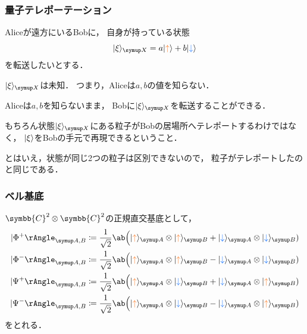 \documentclass[
    10pt,
    ]{sotsu-beamer}
\newcommand{\bitone}{\mathcolor{fire}{\uparrow}}
\newcommand{\bittwo}{\mathcolor{water}{\downarrow}}
\begin{document}
\begin{frame}
    \frametitle{量子テレポーテーション}

    Aliceが遠方にいるBobに，
    自身が持っている状態
    \begin{equation*}
        \ket{\xi}<X> = a \ket{\bitone} + b \ket{\bittwo}
    \end{equation*}
    を転送したいとする．

    \alert{$\ket{\xi}<X>$は未知．}
    つまり，Aliceは$a, b$の値を知らない．

    \pause

    Aliceは$a, b$を知らないまま，
    Bobに$\ket{\xi}<X>$を転送することができる．

    もちろん状態$\ket{\xi}<X>$にある粒子がBobの居場所へテレポートするわけではなく，
    $\ket{\xi}$をBobの手元で再現できるということ．

    {\small
        とはいえ，状態が同じ2つの粒子は区別できないので，
        粒子がテレポートしたのと同じである．
    }

\end{frame}


\begin{frame}
    \frametitle{ベル基底}

    $\symbb{C}^2 \otimes \symbb{C}^2$の正規直交基底として，
        \begin{align*}
            \Ket{\Phi^+}<A,B> 
                &\coloneq \frac{1}{\sqrt{2}}
                    \ab\Big( \ket{\bitone}<A> \otimes \ket{\bitone}<B> + \ket{\bittwo}<A> \otimes \ket{\bittwo}<B> )
            \\
            \Ket{\Phi^-}<A,B> 
                &\coloneq \frac{1}{\sqrt{2}}
                    \ab\Big( \ket{\bitone}<A> \otimes \ket{\bitone}<B> - \ket{\bittwo}<A> \otimes \ket{\bittwo}<B> )
            \\
            \Ket{\Psi^+}<A,B> 
                &\coloneq \frac{1}{\sqrt{2}}
                    \ab\Big( \ket{\bitone}<A> \otimes \ket{\bittwo}<B> + \ket{\bittwo}<A> \otimes \ket{\bitone}<B> )
            \\
            \Ket{\Psi^-}<A,B> 
                &\coloneq \frac{1}{\sqrt{2}}
                    \ab\Big( \ket{\bitone}<A> \otimes \ket{\bittwo}<B> - \ket{\bittwo}<A> \otimes \ket{\bitone}<B> )
        \end{align*}
        をとれる．

\end{frame}
\end{document}
